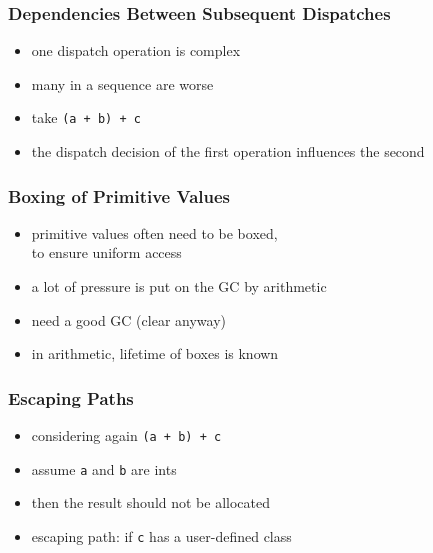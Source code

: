 \documentclass[utf8x]{beamer}
\begin{document}
\begin{frame}
  \frametitle{Dependencies Between Subsequent Dispatches}
  \begin{itemize}
      \item one dispatch operation is complex
      \item many in a sequence are worse
      \item take \texttt{(a + b) + c}
      \item the dispatch decision of the first operation influences the second
  \end{itemize}
\end{frame}




\begin{frame}
  \frametitle{Boxing of Primitive Values}
  \begin{itemize}
      \item primitive values often need to be boxed,\\
      to ensure uniform access
      \item a lot of pressure is put on the GC by arithmetic
      \item need a good GC (clear anyway)
      \item in arithmetic, lifetime of boxes is known
  \end{itemize}
\end{frame}

\begin{frame}
  \frametitle{Escaping Paths}
  \begin{itemize}
      \item considering again \texttt{(a + b) + c}
      \item assume \texttt{a} and \texttt{b} are ints
      \item then the result should not be allocated
      \item escaping path: if \texttt{c} has a user-defined class
  \end{itemize}
\end{frame}
\end{document}
